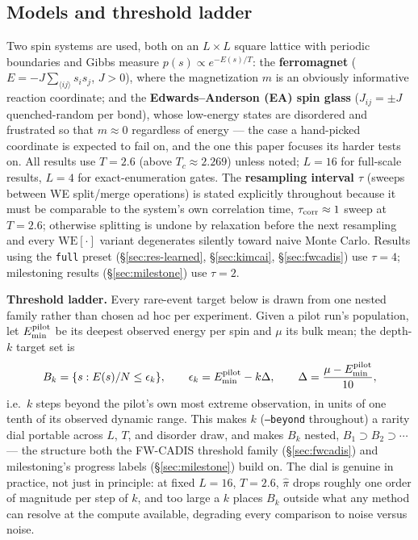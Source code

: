 \documentclass[a4paper,fleqn]{cas-sc}
\begin{document}
	\subsection{Models and threshold ladder}\label{sec:models}
	Two spin systems are used, both on an $L\times L$ square lattice with periodic boundaries
	and Gibbs measure $p(s)\propto e^{-E(s)/T}$: the \textbf{ferromagnet}
	($E=-J\sum_{\langle ij\rangle}s_is_j$, $J>0$), where the magnetization $m$ is an obviously
	informative reaction coordinate; and the \textbf{Edwards--Anderson (EA) spin glass}
	($J_{ij}=\pm J$ quenched-random per bond), whose low-energy states are disordered and
	frustrated so that $m\approx 0$ regardless of energy --- the case a hand-picked coordinate
	is expected to fail on, and the one this paper focuses its harder tests on. All results use
	$T=2.6$ (above $T_c\approx2.269$) unless noted; $L=16$ for full-scale results, $L=4$ for
	exact-enumeration gates. The \textbf{resampling interval $\tau$} (sweeps between WE
	split/merge operations) is stated explicitly throughout because it must be comparable to
	the system's own correlation time, $\tau_{\rm corr}\approx1$ sweep at $T=2.6$; otherwise
	splitting is undone by relaxation before the next resampling and every $\mathrm{WE}[\cdot]$
	variant degenerates silently toward naive Monte Carlo. Results using the \texttt{full}
	preset (\S\ref{sec:res-learned}, \S\ref{sec:kimcai}, \S\ref{sec:fwcadis}) use $\tau=4$;
	milestoning results (\S\ref{sec:milestone}) use $\tau=2$.
	
	\textbf{Threshold ladder.} Every rare-event target below is drawn from one nested family
	rather than chosen ad hoc per experiment. Given a pilot run's population, let
	$E^{\rm pilot}_{\min}$ be its deepest observed energy per spin and $\mu$ its bulk mean; the
	depth-$k$ target set is
	\begin{equation}
		B_k=\{s: E(s)/N\le\epsilon_k\},\qquad
		\epsilon_k=E^{\rm pilot}_{\min}-k\Delta,\qquad
		\Delta=\frac{\mu-E^{\rm pilot}_{\min}}{10},
		\label{eq:beyond}
	\end{equation}
	i.e.\ $k$ steps beyond the pilot's own most extreme observation, in units of one tenth of
	its observed dynamic range. This makes $k$ (\texttt{--beyond} throughout) a rarity dial
	portable across $L$, $T$, and disorder draw, and makes $B_k$ nested,
	$B_1\supset B_2\supset\cdots$ --- the structure both the FW-CADIS threshold family
	(\S\ref{sec:fwcadis}) and milestoning's progress labels (\S\ref{sec:milestone}) build on.
	The dial is genuine in practice, not just in principle: at fixed $L=16$, $T=2.6$, $\hat\pi$
	drops roughly one order of magnitude per step of $k$, and too large a $k$ places $B_k$
	outside what any method can resolve at the compute available, degrading every comparison to
	noise versus noise.
	
\end{document}
